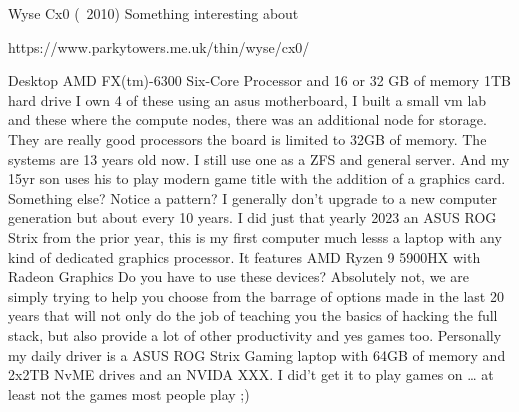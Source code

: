 Wyse Cx0 (~2010)
Something interesting about 

https://www.parkytowers.me.uk/thin/wyse/cx0/

Desktop
AMD FX(tm)-6300 Six-Core Processor and 16 or 32 GB of memory 1TB hard drive
I own 4 of these using an asus motherboard, I built a small vm lab and these where the compute nodes, there was an additional node for storage. They are really good processors the board is limited to 32GB of memory. The systems are 13 years old now. I still use one as a ZFS and general server. And my 15yr son uses his to play modern game title with the addition of a graphics card. 
Something else?
Notice a pattern? I generally don’t upgrade to a new computer generation but about every 10 years. I did just that yearly 2023 an ASUS ROG Strix from the prior year, this is my first computer much lesss a laptop with any kind of dedicated graphics processor. 
It features AMD Ryzen 9 5900HX with Radeon Graphics
Do you have to use these devices? Absolutely not, we are simply trying to help you choose from the barrage of options made in the last 20 years that will not only do the job of teaching you the basics of hacking the full stack, but also provide a lot of other productivity and yes games too. 
Personally my daily driver is a ASUS ROG Strix Gaming laptop with 64GB of memory and 2x2TB NvME drives and an NVIDA XXX. I did’t get it to play games on … at least not the games most people play ;)


